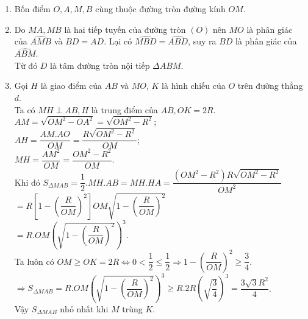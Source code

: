 \begin{ex}
{
    \begin{enumerate}
        \item Bốn điểm $O, A, M, B$ cùng thuộc đường tròn đường kính $OM$.       
 \item Do $MA, MB$ là hai tiếp tuyến của đường tròn $(O)$ nên $MO$ là phân giác của $\widehat{AMB}$ và $BD=AD$.
Lại có $\widehat{MBD}=\widehat{ABD}$, suy ra $BD$ là phân giác của $\widehat{ABM}$.\\
Từ đó $D$ là tâm đường tròn nội tiếp $\Delta ABM$.
        \item Gọi $H$ là giao điểm của $AB$ và $MO$, $K$ là hình chiếu của $O$ trên đường thẳng $d$.\\
Ta có $MH \perp AB, H$ là trung điểm của $AB, OK = 2R$.\\
$AM=\sqrt{OM^2-OA^2}=\sqrt{OM^2-R^2}$;\\
$AH = \dfrac{AM. AO}{OM}=\dfrac{R\sqrt{OM^2-R^2}}{OM}$;\\
$MH=\dfrac{AM^2}{OM}=\dfrac{OM^2-R^2}{OM}$.\\
Khi đó $S_{\Delta MAB}=\dfrac{1}{2}.MH.AB=MH.HA=\dfrac{(OM^2-R^2)R\sqrt{OM^2-R^2}}{OM^2}$ \\
$=R \left[1-\left(\dfrac{R}{OM}\right)^2\right] OM \sqrt{1-\left(\dfrac{R}{OM}\right)^2}$ \\
$=R. OM \left( \sqrt{1-\left(\dfrac{R}{OM}\right)^2}\right)^3$.\\
Ta luôn có $OM \ge OK = 2R \Leftrightarrow 0 < \dfrac{1}{2} \le \dfrac{1}{2} \Rightarrow 1-\left( \dfrac{R}{OM}\right)^2 \ge \dfrac{3}{4}$.\\
$\Rightarrow S_{\Delta MAB}=R. OM \left( \sqrt{1-\left(\dfrac{R}{OM}\right)^2}\right)^3 \ge R. 2R \left( \sqrt{\dfrac{3}{4}}\right)^3=\dfrac{3\sqrt{3}R^2}{4}$.\\
Vậy $S_{\Delta MAB}$ nhỏ nhất khi $M$ trùng $K$.
    \end{enumerate}
    }
\end{ex}

